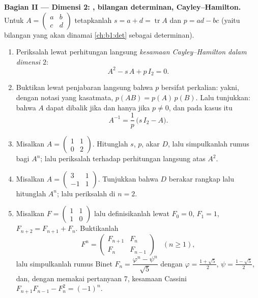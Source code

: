 \begin{problem}
\medskip
\noindent\textbf{Bagian II --- Dimensi 2: , bilangan
determinan, Cayley--Hamilton.} Untuk $A = \begin{pmatrix} a & b\\ c &
d\end{pmatrix}$ tetapkanlah $s = a + d = \operatorname{tr} A$ dan $p = ad
- bc$ (yaitu bilangan yang akan dinamai \cref{ch:b1:det} sebagai
determinan).
\begin{enumerate}[resume]
  \item Periksalah lewat perhitungan langsung \emph{kesamaan
        Cayley--Hamilton dalam dimensi $2$}:
        \[
        A^2 - s\,A + p\,I_2 = 0 .
        \]
  \item Buktikan lewat penjabaran langsung bahwa $p$ bersifat perkalian:
        yakni, dengan notasi yang kasatmata, $p(AB) = p(A)\,p(B)$. Lalu tunjukkan:
        bahwa $A$ dapat dibalik jika dan hanya jika $p \neq 0$, dan pada
        kasus itu
        \[
        A^{-1} = \frac1p\,\bigl(s\,I_2 - A\bigr).
        \]
  \item Misalkan $A = \begin{pmatrix} 1 & 1\\ 0 & 2\end{pmatrix}$.
        Hitunglah $s$, $p$, akar $D$, lalu simpulkanlah rumus
         bagi $A^n$; lalu periksalah terhadap perhitungan langsung
        atas $A^2$.
  \item Misalkan $A = \begin{pmatrix} 3 & 1\\ -1 & 1\end{pmatrix}$.
        Tunjukkan bahwa $D$ berakar rangkap lalu hitunglah $A^n$; lalu periksalah
        di $n = 2$.
  \item Misalkan $F = \begin{pmatrix} 1 & 1\\ 1 & 0\end{pmatrix}$ lalu
        definisikanlah  lewat $F_0 = 0$, $F_1 = 1$,
        $F_{n+2} = F_{n+1} + F_n$. Buktikanlah
        \[
        F^n = \begin{pmatrix} F_{n+1} & F_n\\ F_n &
        F_{n-1}\end{pmatrix} \quad (n \geq 1),
        \]
        lalu simpulkanlah rumus Binet $F_n = \dfrac{\varphi^n -
        \psi^n}{\sqrt5}$ dengan $\varphi = \frac{1 + \sqrt5}2$,
        $\psi = \frac{1 - \sqrt5}2$, dan, dengan memakai pertanyaan 7,
        kesamaan Cassini $F_{n+1}F_{n-1} - F_n^2 = (-1)^n$.
\end{enumerate}


\end{problem}
